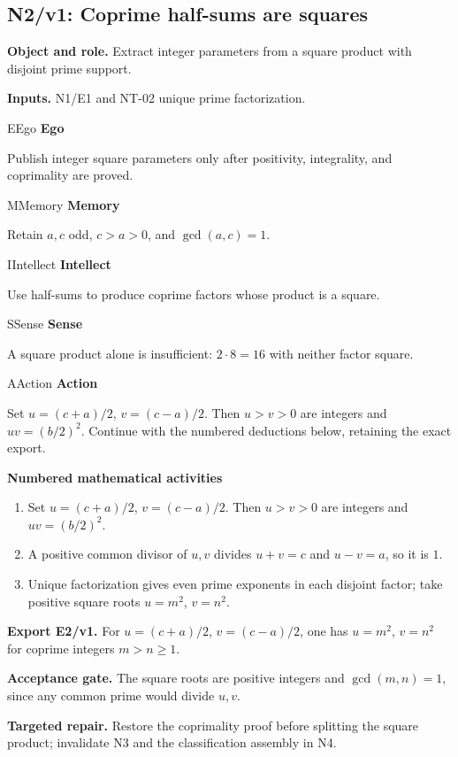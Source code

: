 \documentclass[preprint,12pt,aps,pra,showkeys,amsmath,amssymb,superscriptaddress,floatfix]{revtex4-2}
\theoremstyle{definition}
\theoremstyle{remark}
\newcommand{\mmfaculty}[3]{%
 \begin{mmfacultybox}{#1}{#2}
 {\sffamily\bfseries\color{MMBlue}#2}\par\smallskip #3
 \end{mmfacultybox}}
\newcommand{\field}[2]{\par\smallskip\noindent\textbf{#1.} #2\par}
\begin{document}
\clearpage

\subsection{N2/v1: Coprime half-sums are squares}

\field{Object and role}{Extract integer parameters from a square product with disjoint prime
support.}

\field{Inputs}{N1/E1 and NT-02 unique prime factorization.}

\mmfaculty{E}{Ego}{Publish integer square parameters only after positivity, integrality,
and coprimality are proved.}

\mmfaculty{M}{Memory}{Retain \(a,c\) odd, \(c>a>0\), and \(\gcd(a,c)=1\).}

\mmfaculty{I}{Intellect}{Use half-sums to produce coprime factors whose product is a square.}

\mmfaculty{S}{Sense}{A square product alone is insufficient: \(2\cdot8=16\) with neither
factor square.}

\mmfaculty{A}{Action}{Set \(u=(c+a)/2\), \(v=(c-a)/2\). Then \(u>v>0\) are integers and
\(uv=(b/2)^2\). Continue with the numbered deductions below, retaining
the exact export.}

\smallskip\noindent\textbf{Numbered mathematical activities}

\begin{enumerate}[label=N2.\arabic*,leftmargin=3.4em]

\item Set \(u=(c+a)/2\), \(v=(c-a)/2\). Then \(u>v>0\) are integers and
\(uv=(b/2)^2\).

\item A positive common divisor of \(u,v\) divides \(u+v=c\) and \(u-v=a\), so
it is \(1\).

\item Unique factorization gives even prime exponents in each disjoint factor;
take positive square roots \(u=m^2\), \(v=n^2\).

\end{enumerate}

\field{Export E2/v1}{For \(u=(c+a)/2\), \(v=(c-a)/2\), one has \(u=m^2\), \(v=n^2\) for
coprime integers \(m>n\ge1\).}

\field{Acceptance gate}{The square roots are positive integers and \(\gcd(m,n)=1\), since any
common prime would divide \(u,v\).}

\field{Targeted repair}{Restore the coprimality proof before splitting the square product;
invalidate N3 and the classification assembly in N4.}
\end{document}
